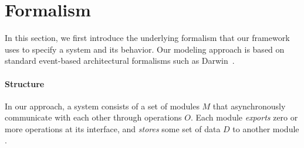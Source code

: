 
\section{Formalism}
\label{sec-formalism}

In this section, we first introduce the underlying formalism that our
framework uses to specify a system and its behavior. Our modeling
approach is based on standard event-based architectural formalisms
such as Darwin~\cite{darwin}.

\paragraph{\textbf{Structure}} In our approach, a system consists of a set of
modules $M$ that asynchronously communicate with each other through
operations $O$.  Each module \textit{exports} zero or more operations
at its interface, and \textit{stores} some set of data $D$ to another module
.

